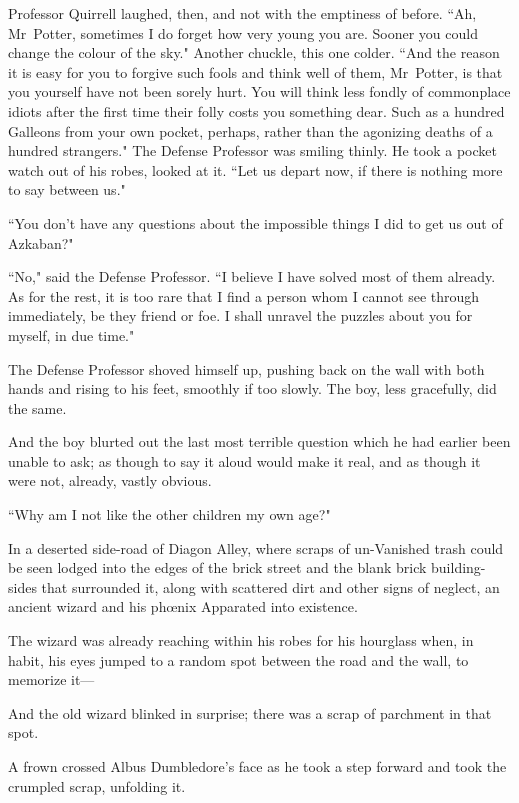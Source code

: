 Professor Quirrell laughed, then, and not with the emptiness of before. ``Ah, Mr~Potter, sometimes I do forget how very young you are. Sooner you could change the colour of the sky." Another chuckle, this one colder. ``And the reason it is easy for you to forgive such fools and think well of them, Mr~Potter, is that you yourself have not been sorely hurt. You will think less fondly of commonplace idiots after the first time their folly costs you something dear. Such as a hundred Galleons from your own pocket, perhaps, rather than the agonizing deaths of a hundred strangers." The Defense Professor was smiling thinly. He took a pocket watch out of his robes, looked at it. ``Let us depart now, if there is nothing more to say between us."

``You don't have any questions about the impossible things I did to get us out of Azkaban?"

``No," said the Defense Professor. ``I believe I have solved most of them already. As for the rest, it is too rare that I find a person whom I cannot see through immediately, be they friend or foe. I shall unravel the puzzles about you for myself, in due time."

The Defense Professor shoved himself up, pushing back on the wall with both hands and rising to his feet, smoothly if too slowly. The boy, less gracefully, did the same.

And the boy blurted out the last most terrible question which he had earlier been unable to ask; as though to say it aloud would make it real, and as though it were not, already, vastly obvious.

``Why am I not like the other children my own age?"

\later

In a deserted side-road of Diagon Alley, where scraps of un-Vanished trash could be seen lodged into the edges of the brick street and the blank brick building-sides that surrounded it, along with scattered dirt and other signs of neglect, an ancient wizard and his phœnix Apparated into existence.

The wizard was already reaching within his robes for his hourglass when, in habit, his eyes jumped to a random spot between the road and the wall, to memorize it—

And the old wizard blinked in surprise; there was a scrap of parchment in that spot.

A frown crossed Albus Dumbledore's face as he took a step forward and took the crumpled scrap, unfolding it.

